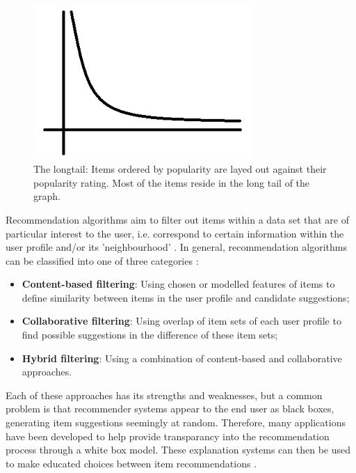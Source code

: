 \documentclass[a4paper,10pt,twocolumn]{article}
\begin{document}
\begin{figure}[!ht]
  \begin{center}
  	
    \includegraphics[width=8.3cm]{data/longtail}
  \end{center}
  \caption{The longtail: Items ordered by popularity are layed out against their popularity rating. Most of the items reside in the long tail of the graph.}
  \label{fig:longtail}
\end{figure}

Recommendation algorithms aim to filter out items within a data set that are of particular interest to the user, i.e. correspond to certain information within the user profile and/or its 'neighbourhood' \cite{burke2002}. In general, recommendation algorithms can be classified into one of three categories \cite{rajaraman2012}:

\begin{itemize}
	\item \textbf{Content-based filtering}: Using chosen or modelled features of items to define similarity between items in the user profile and candidate suggestions;
	\item \textbf{Collaborative filtering}: Using overlap of item sets of each user profile to find possible suggestions in the difference of these item sets;
	\item \textbf{Hybrid filtering}: Using a combination of content-based and collaborative approaches.
\end{itemize}

Each of these approaches has its strengths and weaknesses, but a common problem is that recommender systems appear to the end user as black boxes, generating item suggestions seemingly at random. Therefore, many applications have been developed to help provide transparancy into the recommendation process through a white box model. These explanation systems can then be used to make educated choices between item recommendations \cite{herlocker2000}.
\end{document}
